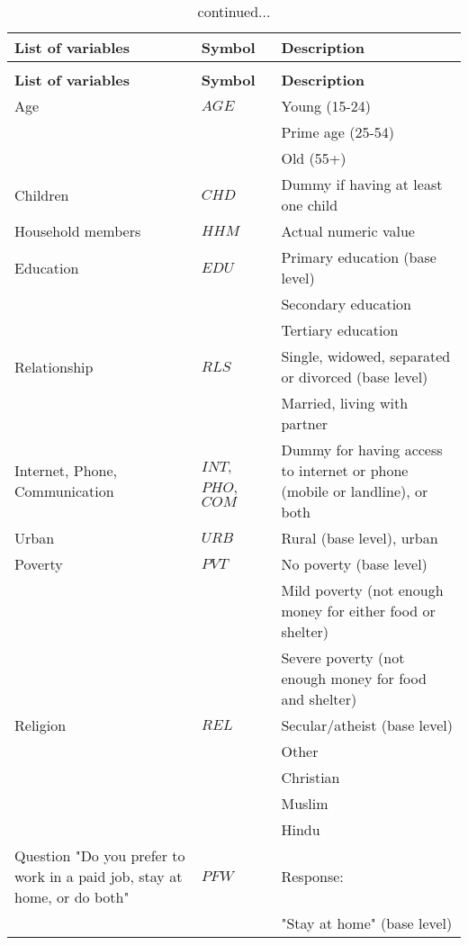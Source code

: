 
\begin{longtable}{|p{}|p{}|p{}|}
	\caption{Description of variables}\label{tab:data_descr}\\
	\hline
		\textbf{List of variables}& \textbf{Symbol} & \textbf{Description} \\
		\hline
		\endfirsthead
	\caption{continued...}\\
		\hline
		\textbf{List of variables} & \textbf{Symbol} & \textbf{Description}  \\
		\hline
		\endhead
		\hline
		\endfoot
		Age &$AGE$ & Young (15-24) \\
		&& Prime age (25-54) \\
		&& Old (55+)\\
		\hline
		Children &$CHD$ & Dummy if having at least one child\\
		\hline
		Household members &$HHM$ & Actual numeric value \\
		\hline
		Education &$EDU$  & Primary education (base level) \\
		&& Secondary education \\
		&& Tertiary education \\
		\hline
		Relationship &$RLS$ &Single, widowed, separated or divorced (base level) \\
		&& Married, living with partner\\
		\hline
		Internet, Phone, Communication & $INT$, $PHO$, $COM$ & Dummy for having access to internet or phone (mobile or landline), or both \\
		\hline
		Urban &$URB$ & Rural (base level), urban \\
		\hline
		Poverty &$PVT$ & No poverty (base level)\\
		&& Mild poverty (not enough money for either food or shelter) \\
		&& Severe poverty (not enough money for food and shelter) \\
		\hline
		Religion &$REL$ & Secular/atheist (base level) \\
		&& Other \\
		&& Christian \\
		&& Muslim \\
		&& Hindu \\
		\hline
		\multirow{1}{0.3\textwidth}{Question "Do you prefer to work in a paid job, stay at home, or do both"} &$PFW$& Response: \\
		&& "Stay at home" (base level)\\

\end{longtable}
